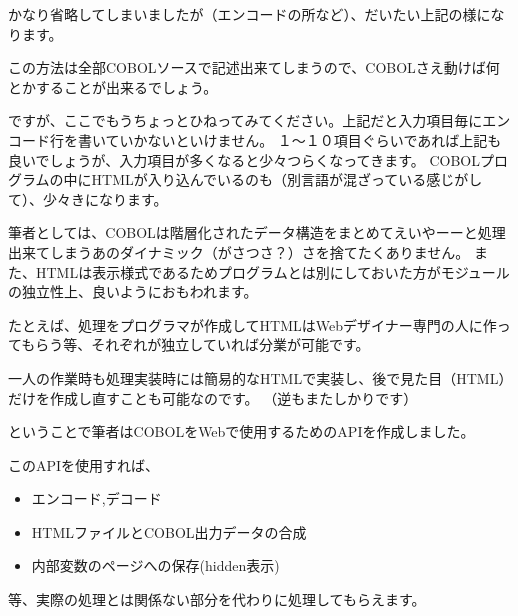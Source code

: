かなり省略してしまいましたが（エンコードの所など）、だいたい上記の様になります。

この方法は全部COBOLソースで記述出来てしまうので、COBOLさえ動けば何とかすることが出来るでしょう。

ですが、ここでもうちょっとひねってみてください。上記だと入力項目毎にエンコード行を書いていかないといけません。
１〜１０項目ぐらいであれば上記も良いでしょうが、入力項目が多くなると少々つらくなってきます。
COBOLプログラムの中にHTMLが入り込んでいるのも（別言語が混ざっている感じがして）、少々きになります。

筆者としては、COBOLは階層化されたデータ構造をまとめてえいやーーと処理出来てしまうあのダイナミック（がさつさ？）さを捨てたくありません。
また、HTMLは表示様式であるためプログラムとは別にしておいた方がモジュールの独立性上、良いようにおもわれます。

たとえば、処理をプログラマが作成してHTMLはWebデザイナー専門の人に作ってもらう等、それぞれが独立していれば分業が可能です。

一人の作業時も処理実装時には簡易的なHTMLで実装し、後で見た目（HTML）だけを作成し直すことも可能なのです。
（逆もまたしかりです）

ということで筆者はCOBOLをWebで使用するためのAPIを作成しました。

このAPIを使用すれば、

\begin{itemize}
\item{ エンコード,デコード }
\item{HTMLファイルとCOBOL出力データの合成}
\item{内部変数のページへの保存(hidden表示)}
\end{itemize}

等、実際の処理とは関係ない部分を代わりに処理してもらえます。

